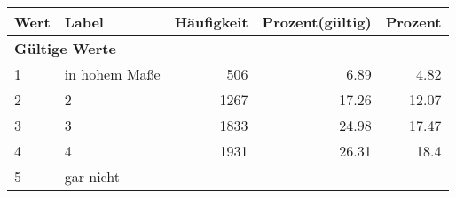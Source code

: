      \begin{longtable}{lXrrr}
     \toprule
     \textbf{Wert} & \textbf{Label} & \textbf{Häufigkeit} & \textbf{Prozent(gültig)} & \textbf{Prozent} \\
     \endhead
     \midrule
     \multicolumn{5}{l}{\textbf{Gültige Werte}}\\

     1 &
     \multicolumn{1}{X}{ in hohem Maße   } &


       \num{506} &
       \num[round-mode=places,round-precision=2]{6.89} &
         \num[round-mode=places,round-precision=2]{4.82} \\

     2 &
     \multicolumn{1}{X}{ 2   } &


       \num{1267} &
       \num[round-mode=places,round-precision=2]{17.26} &
         \num[round-mode=places,round-precision=2]{12.07} \\

     3 &
     \multicolumn{1}{X}{ 3   } &


       \num{1833} &
       \num[round-mode=places,round-precision=2]{24.98} &
         \num[round-mode=places,round-precision=2]{17.47} \\

     4 &
     \multicolumn{1}{X}{ 4   } &


       \num{1931} &
       \num[round-mode=places,round-precision=2]{26.31} &
         \num[round-mode=places,round-precision=2]{18.4} \\

     5 &
     \multicolumn{1}{X}{ gar nicht   } &



\end{longtable}
